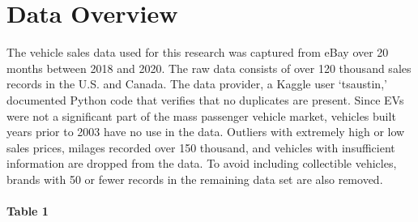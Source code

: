 \documentclass{article}
\begin{document}
\hypertarget{data-overview}{%
\section{Data Overview}\label{data-overview}}

The vehicle sales data used for this research was captured from eBay
over 20 months between 2018 and 2020. The raw data consists of over 120
thousand sales records in the U.S. and Canada. The data provider, a
Kaggle user `tsaustin,' documented Python code that verifies that no
duplicates are present. Since EVs were not a significant part of the
mass passenger vehicle market, vehicles built years prior to 2003 have
no use in the data. Outliers with extremely high or low sales prices,
milages recorded over 150 thousand, and vehicles with insufficient
information are dropped from the data. To avoid including collectible
vehicles, brands with 50 or fewer records in the remaining data set are
also removed.

\hypertarget{table-1}{%
\paragraph{Table 1}\label{table-1}}
\end{document}
